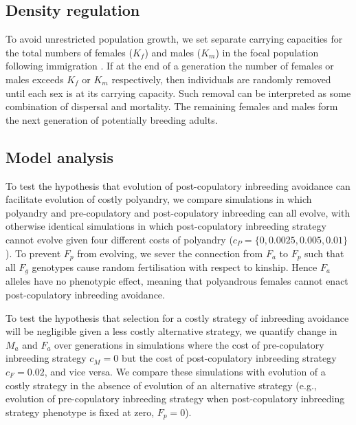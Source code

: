 \documentclass[10pt,letterpaper]{article}
\begin{document}
\subsection*{Density regulation}

To avoid unrestricted population growth, we set separate carrying capacities for the total numbers of females ($K_{f}$) and males ($K_{m}$) in the focal population following immigration \cite[][]{Guillaume2009, Duthie}. If at the end of a generation the number of females or males exceeds $K_{f}$ or $K_{m}$  respectively, then individuals are randomly removed until each sex is at its carrying capacity. Such removal can be interpreted as some combination of dispersal and mortality. The remaining females and males form the next generation of potentially breeding adults.

\subsection*{Model analysis}

To test the hypothesis that evolution of post-copulatory inbreeding avoidance can facilitate evolution of costly polyandry, we compare simulations in which polyandry and pre-copulatory and post-copulatory inbreeding can all evolve, with otherwise identical simulations in which post-copulatory inbreeding strategy cannot evolve given four different costs of polyandry ($c_{P} = \{0, 0.0025, 0.005,  0.01\}$). To prevent $F_{p}$ from evolving, we sever the connection from $F_{a}$ to $F_{p}$ such that all $F_{g}$ genotypes cause random fertilisation with respect to kinship. Hence $F_{a}$ alleles have no phenotypic effect, meaning that polyandrous females cannot enact post-copulatory inbreeding avoidance.

To test the hypothesis that selection for a costly strategy of inbreeding avoidance will be negligible given a less costly alternative strategy, we quantify change in $M_{a}$ and $F_{a}$ over generations in simulations where the cost of pre-copulatory inbreeding strategy $c_{M}=0$ but the cost of post-copulatory inbreeding strategy $c_{F}=0.02$, and vice versa. We compare these simulations with evolution of a costly strategy in the absence of evolution of an alternative strategy (e.g., evolution of pre-copulatory inbreeding strategy when post-copulatory inbreeding strategy phenotype is fixed at zero, $F_{p}=0$).
\end{document}
